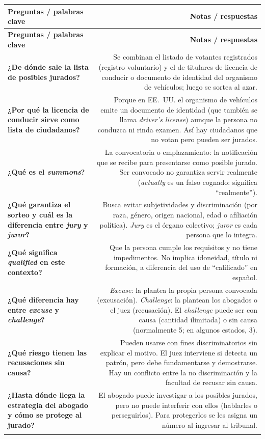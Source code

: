 \documentclass[12pt,oneside]{book}
\newcommand{\cq}[2]{\textbf{#1} & #2 \\ \addlinespace[0.5em]}
\begin{document}
\begingroup
\small
\begin{longtable}{QR}
\toprule
\textbf{Preguntas / palabras clave} & \textbf{Notas / respuestas} \\
\midrule
\endfirsthead
\toprule
\textbf{Preguntas / palabras clave} & \textbf{Notas / respuestas} \\
\midrule
\endhead

\cq{¿De dónde sale la lista de posibles jurados?}{Se combinan el listado de votantes registrados (registro voluntario) y el de titulares de licencia de conducir o documento de identidad del organismo de vehículos; luego se sortea al azar.}

\cq{¿Por qué la licencia de conducir sirve como lista de ciudadanos?}{Porque en EE.~UU. el organismo de vehículos emite un documento de identidad (que también se llama \textit{driver's license}) aunque la persona no conduzca ni rinda examen. Así hay ciudadanos que no votan pero pueden ser jurados.}

\cq{¿Qué es el \textit{summons}?}{La convocatoria o emplazamiento: la notificación que se recibe para presentarse como posible jurado. Ser convocado no garantiza servir realmente (\textit{actually} es un falso cognado: significa ``realmente'').}

\cq{¿Qué garantiza el sorteo y cuál es la diferencia entre \textit{jury} y \textit{juror}?}{Busca evitar subjetividades y discriminación (por raza, género, origen nacional, edad o afiliación política). \textit{Jury} es el órgano colectivo; \textit{juror} es cada persona que lo integra.}

\cq{¿Qué significa \textit{qualified} en este contexto?}{Que la persona cumple los requisitos y no tiene impedimentos. No implica idoneidad, título ni formación, a diferencia del uso de ``calificado'' en español.}

\cq{¿Qué diferencia hay entre \textit{excuse} y \textit{challenge}?}{\textit{Excuse}: la plantea la propia persona convocada (excusación). \textit{Challenge}: la plantean los abogados o el juez (recusación). El \textit{challenge} puede ser con causa (cantidad ilimitada) o sin causa (normalmente 5; en algunos estados, 3).}

\cq{¿Qué riesgo tienen las recusaciones sin causa?}{Pueden usarse con fines discriminatorios sin explicar el motivo. El juez interviene si detecta un patrón, pero debe fundamentarse y demostrarse. Hay un conflicto entre la no discriminación y la facultad de recusar sin causa.}

\cq{¿Hasta dónde llega la estrategia del abogado y cómo se protege al jurado?}{El abogado puede investigar a los posibles jurados, pero no puede interferir con ellos (hablarles o perseguirlos). Para protegerlos se les asigna un número al ingresar al tribunal.}


\end{longtable}
\end{document}
